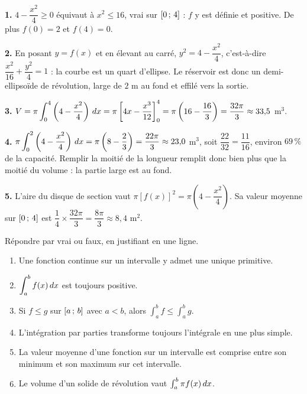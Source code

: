 \begin{corrige}
\textbf{1.} $4-\dfrac{x^{2}}{4} \geq 0$ équivaut à $x^{2} \leq 16$, vrai sur
$\left[0\,;\,4\right]$ : $f$ y est définie et positive. De plus $f(0) = 2$ et
$f(4) = 0$.

\textbf{2.} En posant $y = f(x)$ et en élevant au carré,
$y^{2} = 4-\dfrac{x^{2}}{4}$, c'est-à-dire
$\dfrac{x^{2}}{16}+\dfrac{y^{2}}{4} = 1$ : la courbe est un quart d'ellipse. Le
réservoir est donc un demi-ellipsoïde de révolution, large de $2$ m au fond et
effilé vers la sortie.

\textbf{3.} $V = \pi\displaystyle\int_{0}^{4}\left(4-\frac{x^{2}}{4}\right)\,dx
= \pi\left[4x-\frac{x^{3}}{12}\right]_{0}^{4}
= \pi\left(16-\frac{16}{3}\right) = \frac{32\pi}{3} \approx 33{,}5$ m$^{3}$.

\textbf{4.} $\pi\displaystyle\int_{0}^{2}\left(4-\frac{x^{2}}{4}\right)\,dx
= \pi\left(8-\frac{2}{3}\right) = \frac{22\pi}{3} \approx 23{,}0$ m$^{3}$, soit
$\dfrac{22}{32} = \dfrac{11}{16}$, environ $69\,\%$ de la capacité. Remplir la
moitié de la longueur remplit donc bien plus que la moitié du volume : la
partie large est au fond.

\textbf{5.} L'aire du disque de section vaut
$\pi\left[f(x)\right]^{2} = \pi\left(4-\dfrac{x^{2}}{4}\right)$. Sa valeur
moyenne sur $\left[0\,;\,4\right]$ est
$\dfrac{1}{4}\times\dfrac{32\pi}{3} = \dfrac{8\pi}{3} \approx 8{,}4$ m$^{2}$.
\end{corrige}


\begin{jemeteste}
Répondre par vrai ou faux, en justifiant en une ligne.

\begin{enumerate}[label=\textbf{\arabic*.}, leftmargin=*, itemsep=0.28em]
  \item Une fonction continue sur un intervalle y admet une unique primitive.
  \item $\displaystyle\int_{a}^{b} f(x)\,dx$ est toujours positive.
  \item Si $f \leq g$ sur $\left[a\,;\,b\right]$ avec $a<b$, alors
        $\int_{a}^{b} f \leq \int_{a}^{b} g$.
  \item L'intégration par parties transforme toujours l'intégrale en une plus
        simple.
  \item La valeur moyenne d'une fonction sur un intervalle est comprise entre
        son minimum et son maximum sur cet intervalle.
  \item Le volume d'un solide de révolution vaut $\int_{a}^{b} \pi f(x)\,dx$.
\end{enumerate}
\end{jemeteste}


